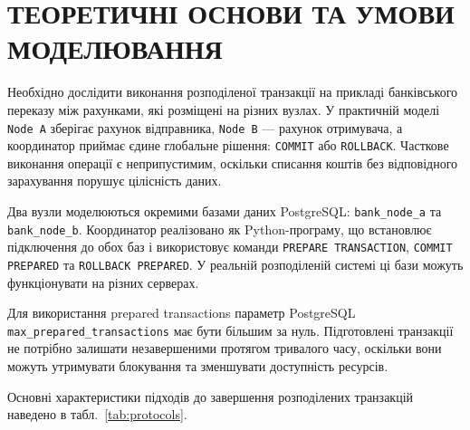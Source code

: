 \section{ТЕОРЕТИЧНІ ОСНОВИ ТА УМОВИ МОДЕЛЮВАННЯ}

Необхідно дослідити виконання розподіленої транзакції на прикладі банківського переказу між рахунками, які розміщені на різних вузлах. У практичній моделі \texttt{Node A} зберігає рахунок відправника, \texttt{Node B} --- рахунок отримувача, а координатор приймає єдине глобальне рішення: \texttt{COMMIT} або \texttt{ROLLBACK}. Часткове виконання операції є неприпустимим, оскільки списання коштів без відповідного зарахування порушує цілісність даних.

Два вузли моделюються окремими базами даних PostgreSQL: \texttt{bank\_node\_a} та \texttt{bank\_node\_b}. Координатор реалізовано як Python-програму, що встановлює підключення до обох баз і використовує команди \texttt{PREPARE TRANSACTION}, \texttt{COMMIT PREPARED} та \texttt{ROLLBACK PREPARED}. У реальній розподіленій системі ці бази можуть функціонувати на різних серверах.

Для використання prepared transactions параметр PostgreSQL \texttt{max\_prepared\_transactions} має бути більшим за нуль. Підготовлені транзакції не потрібно залишати незавершеними протягом тривалого часу, оскільки вони можуть утримувати блокування та зменшувати доступність ресурсів.

Основні характеристики підходів до завершення розподілених транзакцій наведено в табл.~\ref{tab:protocols}.

